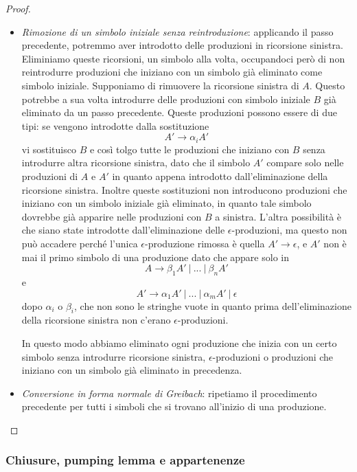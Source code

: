 \documentclass[12pt]{article}
\numberwithin{theorem}{subsection}
\begin{document}
\begin{proof}
\begin{itemize}
		\item \textit{Rimozione di un simbolo iniziale senza reintroduzione}: applicando il passo precedente, potremmo aver introdotto delle produzioni in ricorsione sinistra. Eliminiamo queste ricorsioni, un simbolo alla volta, occupandoci però di non reintrodurre produzioni che iniziano con un simbolo già eliminato come simbolo iniziale. Supponiamo di rimuovere la ricorsione sinistra di $A$. Questo potrebbe a sua volta introdurre delle produzioni con simbolo iniziale $B$ già eliminato da un passo precedente. Queste produzioni possono essere di due tipi: se vengono introdotte dalla sostituzione
		\[
		A' \rightarrow \alpha_i A'
		\]
		vi sostituisco $B$ e così tolgo tutte le produzioni che iniziano con $B$ senza introdurre altra ricorsione sinistra, dato che il simbolo $A'$ compare solo nelle produzioni di $A$ e $A'$ in quanto appena introdotto dall'eliminazione della ricorsione sinistra. Inoltre queste sostituzioni non introducono produzioni che iniziano con un simbolo iniziale già eliminato, in quanto tale simbolo dovrebbe già apparire nelle produzioni con $B$ a sinistra. L'altra possibilità è che siano state introdotte dall'eliminazione delle $\epsilon$-produzioni, ma questo non può accadere perché l'unica $\epsilon$-produzione rimossa è quella $A' \rightarrow \epsilon$, e $A'$ non è mai il primo simbolo di una produzione dato che appare solo in
		\[
		A \rightarrow \beta_1 A' \ \vert \ ... \ \vert \ \beta_n A'
		\]
		e
		\[
		A' \rightarrow \alpha_1 A' \ \vert \ ... \ \vert \ \alpha_m A' \ \vert \ \epsilon
		\]
		dopo $\alpha_i$ o $\beta_i$, che non sono le stringhe vuote in quanto prima dell'eliminazione della ricorsione sinistra non c'erano $\epsilon$-produzioni.
		
		In questo modo abbiamo eliminato ogni produzione che inizia con un certo simbolo senza introdurre ricorsione sinistra, $\epsilon$-produzioni o produzioni che iniziano con un simbolo già eliminato in precedenza.
		
		\item \textit{Conversione in forma normale di Greibach}: ripetiamo il procedimento precedente per tutti i simboli che si trovano all'inizio di una produzione.
	\end{itemize}
\end{proof}

\subsubsection{Chiusure, pumping lemma e appartenenze}
\end{document}
